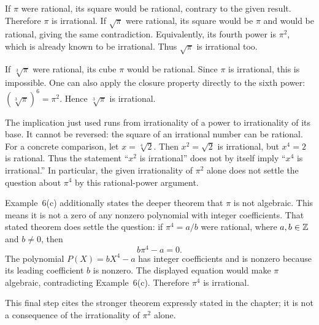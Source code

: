 If $\pi$ were rational, its square would be rational, contrary
to the given result. Therefore $\pi$ is irrational.
If $\sqrt\pi$ were rational, its square would be $\pi$ and would
be rational, giving the same contradiction. Equivalently, its
fourth power is $\pi^2$, which is already known to be irrational.
Thus $\sqrt\pi$ is irrational too.

If $\sqrt[3]\pi$ were rational, its cube $\pi$ would be rational.
Since $\pi$ is irrational, this is impossible. One can also apply
the closure property directly to the sixth power:
$(\sqrt[3]\pi)^6=\pi^2$. Hence $\sqrt[3]\pi$ is irrational.

The implication just used runs from irrationality of a power to
irrationality of its base. It cannot be reversed: the square of
an irrational number can be rational. For a concrete comparison,
let $x=\sqrt[4]{2}$. Then $x^2=\sqrt2$ is irrational, but
$x^4=2$ is rational. Thus the statement ``$x^2$ is irrational''
does not by itself imply ``$x^4$ is irrational.'' In particular,
the given irrationality of $\pi^2$ alone does not settle the
question about $\pi^4$ by this rational-power argument.

Example~6(c) additionally states the deeper theorem that $\pi$
is not algebraic. This means it is not a zero of any nonzero
polynomial with integer coefficients. That stated theorem does
settle the question: if $\pi^4=a/b$ were rational, where
$a,b\in\mathbb{Z}$ and $b\ne0$, then
\[
 b\pi^4-a=0.
\]
The polynomial $P(X)=bX^4-a$ has integer coefficients and is
nonzero because its leading coefficient $b$ is nonzero. The
displayed equation would make $\pi$ algebraic, contradicting
Example~6(c). Therefore $\pi^4$ is irrational.

This final step cites the stronger theorem expressly stated in
the chapter; it is not a consequence of the irrationality of
$\pi^2$ alone.
